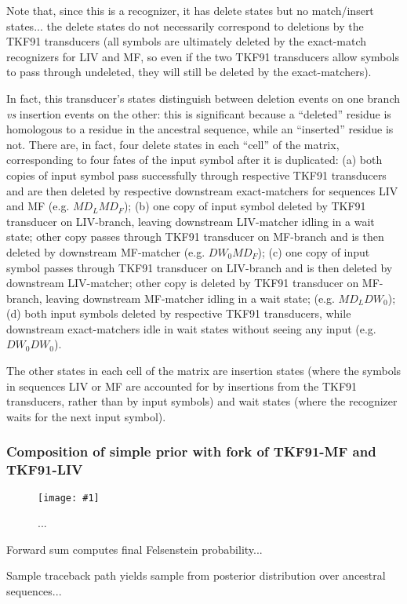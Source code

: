 \documentclass{article}
\newcommand{\figlabel}[1]{\label{Figures.#1}}
\newcommand{\easyfig}[4]{
\begin{figure}
\texttt{[image: \#1]}
\caption{ \figlabel{#3} #4}
\end{figure}}
\newcommand{\widepngfig}[2]{\easyfig{#1.png}{width=\textwidth}{#1}{#2}}
\begin{document}
Note that, since this is a recognizer, it has delete states but no match/insert states...
the delete states do not necessarily correspond to deletions by the TKF91 transducers
(all symbols are ultimately deleted by the exact-match recognizers for LIV and MF,
so even if the two TKF91 transducers allow symbols to pass through undeleted,
they will still be deleted by the exact-matchers).

In fact, this transducer's states distinguish between
deletion events on one branch {\em vs} insertion events on the other:
this is significant because a ``deleted'' residue is homologous to a residue in the ancestral sequence,
while an ``inserted'' residue is not.
There are, in fact, four delete states in each ``cell'' of the matrix,
corresponding to four fates of the input symbol after it is duplicated:
(a) both copies of input symbol pass successfully through respective TKF91 transducers
and are then deleted by respective downstream exact-matchers for sequences LIV and MF
 (e.g. $M D_L M D_F$);
(b) one copy of input symbol deleted by TKF91 transducer on LIV-branch,
leaving downstream LIV-matcher idling in a wait state;
other copy passes through TKF91 transducer on MF-branch and is then deleted by downstream MF-matcher
 (e.g. $D W_0 M D_F$);
(c) one copy of input symbol passes through TKF91 transducer on LIV-branch
and is then deleted by downstream LIV-matcher;
other copy is deleted by TKF91 transducer on MF-branch,
leaving downstream MF-matcher idling in a wait state;
 (e.g. $M D_L D W_0$);
(d) both input symbols deleted by respective TKF91 transducers,
while downstream exact-matchers idle in wait states without seeing any input
 (e.g. $D W_0 D W_0$).

The other states in each cell of the matrix are insertion states
(where the symbols in sequences LIV or MF are accounted for by insertions from the TKF91 transducers,
rather than by input symbols)
and wait states (where the recognizer waits for the next input symbol).



\subsubsection{Composition of simple prior with fork of TKF91-MF and TKF91-LIV}

\widepngfig{root-fork-tkf91liv-tkf91mf}{...}

Forward sum computes final Felsenstein probability...

Sample traceback path yields sample from posterior distribution over ancestral sequences...
\end{document}
